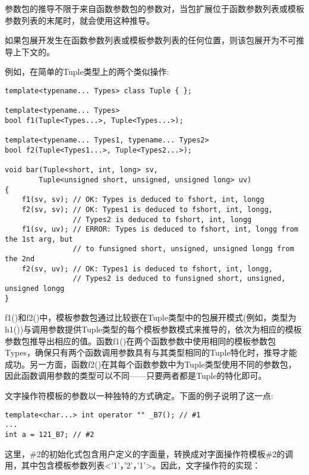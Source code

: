 参数包的推导不限于来自函数参数包的参数对，当包扩展位于函数参数列表或模板参数列表的末尾时，就会使用这种推导。

\begin{tcolorbox}[colback=webgreen!5!white,colframe=webgreen!75!black]
\hspace*{0.75cm}如果包展开发生在函数参数列表或模板参数列表的任何位置，则该包展开为不可推导上下文的。
\end{tcolorbox}

例如，在简单的Tuple类型上的两个类似操作:

\begin{lstlisting}[style=styleCXX]
template<typename... Types> class Tuple { };

template<typename... Types>
bool f1(Tuple<Types...>, Tuple<Types...>);

template<typename... Types1, typename... Types2>
bool f2(Tuple<Types1...>, Tuple<Types2...>);

void bar(Tuple<short, int, long> sv,
		Tuple<unsigned short, unsigned, unsigned long> uv)
{
	f1(sv, sv); // OK: Types is deduced to fshort, int, longg
	f2(sv, sv); // OK: Types1 is deduced to fshort, int, longg,
				// Types2 is deduced to fshort, int, longg
	f1(sv, uv); // ERROR: Types is deduced to fshort, int, longg from the 1st arg, but
				// to funsigned short, unsigned, unsigned longg from the 2nd
	f2(sv, uv); // OK: Types1 is deduced to fshort, int, longg,
				// Types2 is deduced to funsigned short, unsigned, unsigned longg
}
\end{lstlisting}

f1()和f2()中，模板参数包通过比较嵌在Tuple类型中的包展开模式(例如，类型为h1())与调用参数提供Tuple类型的每个模板参数模式来推导的，依次为相应的模板参数包推导出相应的值。函数f1()在两个函数参数中使用相同的模板参数包Types，确保只有两个函数调用参数具有与其类型相同的Tuple特化时，推导才能成功。另一方面，函数f2()在其每个函数参数中为Tuple类型使用不同的参数包，因此函数调用参数的类型可以不同——只要两者都是Tuple的特化即可。


文字操作符模板的参数以一种独特的方式确定。下面的例子说明了这一点:

\begin{lstlisting}[style=styleCXX]
template<char...> int operator "" _B7(); // #1
...
int a = 121_B7; // #2
\end{lstlisting}

这里，\#2的初始化式包含用户定义的字面量，转换成对字面操作符模板\#2的调用，其中包含模板参数列表<'1'，'2'，'1'>。因此，文字操作符的实现：


